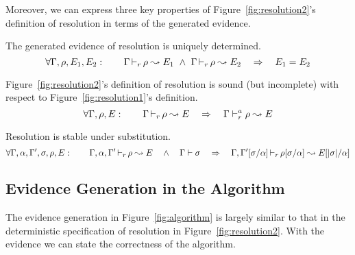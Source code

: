Moreover, we can express three key properties of Figure~\ref{fig:resolution2}'s
definition of resolution in terms of the generated evidence.
\begin{lemma}[Determinacy]
The generated evidence of resolution is uniquely determined.
\[\forall \Gamma, \rho, E_1, E_2: \quad\quad \Gamma \mathop{\vdash_{r}} \rho \leadsto E_1 ~\wedge~ \Gamma \mathop{\vdash_{r}} \rho \leadsto E_2 \quad\Rightarrow\quad E_1 = E_2 \]
\end{lemma}
\begin{lemma}[Soundness]
Figure~\ref{fig:resolution2}'s definition of resolution is sound (but
incomplete) with respect to Figure~\ref{fig:resolution1}'s definition.
\[\forall \Gamma, \rho, E: \quad\quad \Gamma \mathop{\vdash_{r}} \rho \leadsto E \quad\Rightarrow\quad \Gamma \vdash^a_{r} \rho \leadsto E \]
\end{lemma}
\begin{lemma}[Coherence]
Resolution is stable under substitution.
\[\forall \Gamma,\alpha,\Gamma',\sigma,\rho, E: \quad\quad 
\Gamma,\alpha,\Gamma' \mathop{\vdash_{r}} \rho \leadsto E \quad\wedge\quad \Gamma \vdash \sigma
\quad\Rightarrow\quad 
\Gamma,\Gamma'[\sigma/\alpha] \mathop{\vdash_{r}} \rho[\sigma/\alpha] \leadsto E[|\sigma|/\alpha] \]
\end{lemma}

\subsection{Evidence Generation in the Algorithm}

The evidence generation in Figure~\ref{fig:algorithm} is largely similar to
that in the deterministic specification of resolution in
Figure~\ref{fig:resolution2}.
With the evidence we can state the correctness of the algorithm.

